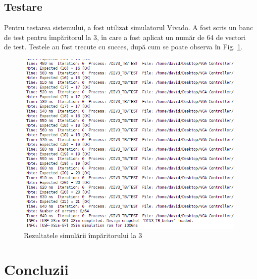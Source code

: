 \documentclass[a4paper,11pt,romanian]{article}
\begin{document}
{\subsection{Testare}

Pentru testarea sistemului, a fost utilizat simulatorul Vivado. A fost scris un banc de test pentru \^{i}mp\u{a}ritorul la 3, \^{i}n care a fost aplicat un num\u{a}r de 64 de vectori de test. Testele au fost trecute cu succes, dup\u{a} cum se poate observa \^{i}n Fig. \ref{fig:sim}.

 \begin{figure}
  \begin{center}
   \includegraphics[scale=0.5]{sim.png}
   \caption{Rezultatele simul\u{a}rii \^{i}mp\u{a}ritorului la 3}
   \label{fig:sim}
  \end{center}
 \end{figure}

\section{Concluzii}

}
\end{document}
